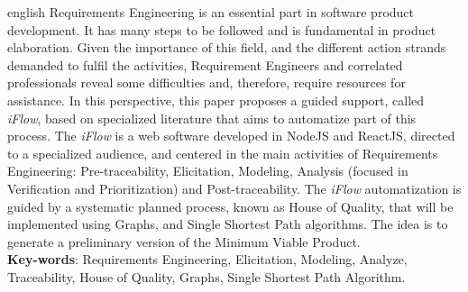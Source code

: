 \begin{resumo}[Abstract]
 \begin{otherlanguage*}{english}
    Requirements Engineering is an essential part in software product development. It has many steps to be followed and is fundamental in product elaboration. Given the importance of this field, and the different action strands demanded to fulfil the activities, Requirement Engineers and correlated professionals reveal some difficulties and, therefore, require resources for assistance. In this perspective, this paper proposes a guided support, called \textit{iFlow}, based on specialized literature that aims to automatize part of this process. The \textit{iFlow} is a web software developed in NodeJS and ReactJS, directed to a specialized audience, and centered in the main activities of Requirements Engineering: Pre-traceability, Elicitation, Modeling, Analysis (focused in Verification and Prioritization) and Post-traceability. The \textit{iFlow} automatization is guided by a systematic planned process, known as House of Quality, that will be implemented using Graphs, and Single Shortest Path algorithms. The idea is to generate a preliminary version of the Minimum Viable Product.
   \vspace{\onelineskip}
   \noindent
   \\
   \textbf{Key-words}: Requirements Engineering, Elicitation, Modeling, Analyze, Traceability, House of Quality, Graphs, Single Shortest Path Algorithm.
 \end{otherlanguage*}
\end{resumo}
